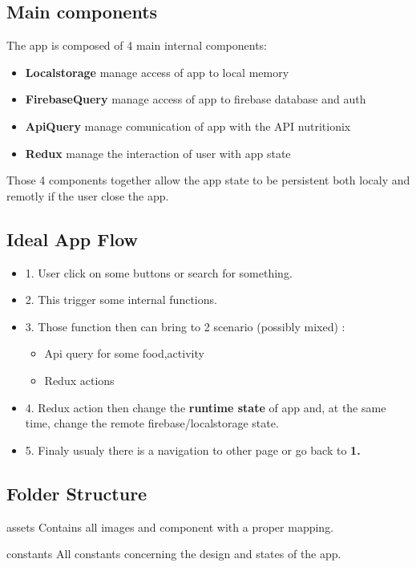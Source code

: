 \documentclass[12pt,hidelinks]{article}
\begin{document}
\subsection{Main components}
The app is composed of 4 main internal components:
\begin{itemize}
	\item \textbf{Localstorage} manage  access of app to local memory
	\item \textbf{FirebaseQuery} manage access of app to firebase database and auth
	\item \textbf{ApiQuery} manage comunication of app with the API nutritionix
	\item \textbf{Redux} manage the interaction of user with app state
\end{itemize}
Those 4 components together allow the app state to be persistent both localy and remotly if the user close the app.
\subsection{Ideal App Flow}
	\begin{itemize}
		\item 1. User click on some buttons or search for something.
		\item 2. This trigger some internal functions.
		\item 3. Those function then can bring to 2 scenario (possibly mixed) :
		\begin{itemize}
			\item Api query for some food,activity
   			\item Redux actions
		\end{itemize}
		\item 4. Redux action then change the \textbf{runtime state} of app and, at the same time, change the remote firebase/localstorage state.
  		\item 5. Finaly usualy there is a navigation to other page or go back to \textbf{1.}
	\end{itemize}
\subsection{Folder Structure}
	\begin{docCommand}{assets}{}
		Contains all images and component with a proper mapping.
	\end{docCommand}

	\begin{docCommand}{constants}{}
		All constants concerning the design and states of the app.
	\end{docCommand}
\end{document}

